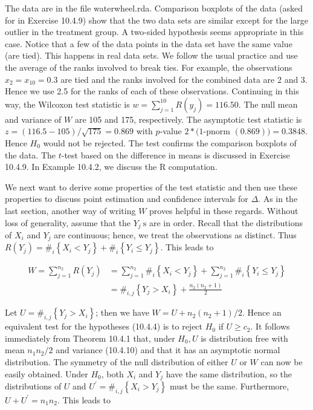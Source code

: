 The data are in the file waterwheel.rda. Comparison boxplots of the data (asked for in Exercise 10.4.9) show that the two data sets are similar except for the large outlier in the treatment group. A two-sided hypothesis seems appropriate in this case. Notice that a few of the data points in the data set have the same value (are tied). This happens in real data sets. We follow the usual practice and use the average of the ranks involved to break ties. For example, the observations $x_{2}=x_{10}=0.3$ are tied and the ranks involved for the combined data are 2 and 3. Hence we use 2.5 for the ranks of each of these observations. Continuing in this way, the Wilcoxon test statistic is $w=\sum_{j=1}^{10} R\left(y_{j}\right)=116.50$. The null mean and variance of $W$ are 105 and 175, respectively. The asymptotic test statistic is $z=(116.5-105) / \sqrt{175}=0.869$ with $p$-value $2 *(1$-pnorm $(0.869))=0.3848$. Hence $H_{0}$ would not be rejected. The test confirms the comparison boxplots of the data. The $t$-test based on the difference in means is discussed in Exercise 10.4.9. In Example 10.4.2, we discuss the R computation.

We next want to derive some properties of the test statistic and then use these properties to discuss point estimation and confidence intervals for $\Delta$. As in the last section, another way of writing $W$ proves helpful in these regards. Without loss of generality, assume that the $Y_{j} \mathrm{~s}$ are in order. Recall that the distributions\\
of $X_{i}$ and $Y_{j}$ are continuous; hence, we treat the observations as distinct. Thus $R\left(Y_{j}\right)=\#_{i}\left\{X_{i}<Y_{j}\right\}+\#_{i}\left\{Y_{i} \leq Y_{j}\right\}$. This leads to


\begin{align*}
W=\sum_{j=1}^{n_{2}} R\left(Y_{j}\right) & =\sum_{j=1}^{n_{2}} \#_{i}\left\{X_{i}<Y_{j}\right\}+\sum_{j=1}^{n_{2}} \#_{i}\left\{Y_{i} \leq Y_{j}\right\} \\
& =\#_{i, j}\left\{Y_{j}>X_{i}\right\}+\frac{n_{2}\left(n_{2}+1\right)}{2} \tag{10.4.12}
\end{align*}


Let $U=\#_{i, j}\left\{Y_{j}>X_{i}\right\}$; then we have $W=U+n_{2}\left(n_{2}+1\right) / 2$. Hence an equivalent test for the hypotheses (10.4.4) is to reject $H_{0}$ if $U \geq c_{2}$. It follows immediately from Theorem 10.4.1 that, under $H_{0}, U$ is distribution free with mean $n_{1} n_{2} / 2$ and variance (10.4.10) and that it has an asymptotic normal distribution. The symmetry of the null distribution of either $U$ or $W$ can now be easily obtained. Under $H_{0}$, both $X_{i}$ and $Y_{j}$ have the same distribution, so the distributions of $U$ and $U^{\prime}=\#_{i, j}\left\{X_{i}>Y_{j}\right\}$ must be the same. Furthermore, $U+U^{\prime}=n_{1} n_{2}$. This leads to

